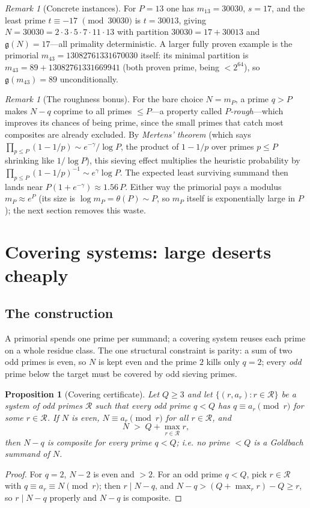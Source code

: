 \documentclass[11pt]{article}
\theoremstyle{plain}
\newtheorem{proposition}[theorem]{Proposition}
\theoremstyle{definition}
\theoremstyle{remark}
\newtheorem{remark}[theorem]{Remark}
\newcommand{\N}{N}
\newcommand{\g}{\mathfrak{g}}
\begin{document}
\begin{remark}[Concrete instances]\label{rem:concrete}
For $P=13$ one has $m_{13}=30030$, $s=17$, and the least prime $t\equiv-17$
$\pmod{30030}$ is $t=30013$, giving $\N=30030=2\cdot3\cdot5\cdot7\cdot11\cdot13$
with partition $30030=17+30013$ and $\g(\N)=17$---all primality deterministic. A
larger fully proven example is the primorial $m_{43}=13082761331670030$ itself:
its minimal partition is $m_{43}=89+13082761331669941$ (both proven prime, being
$<2^{64}$), so $\g(m_{43})=89$ unconditionally.
\end{remark}

\begin{remark}[The roughness bonus]\label{rem:rough}
For the bare choice $\N=m_P$, a prime $q>P$ makes $\N-q$ coprime to all primes
$\le P$---a property called \emph{$P$-rough}---which improves its chances of being
prime, since the small primes that catch most composites are already excluded. By
\emph{Mertens' theorem} (which says $\prod_{p\le P}(1-1/p)\sim e^{-\gamma}/\log P$,
the product of $1-1/p$ over primes $p\le P$ shrinking like $1/\log P$), this
sieving effect multiplies the heuristic probability by
$\prod_{p\le P}(1-1/p)^{-1}\sim e^\gamma\log P$. The expected least surviving
summand then lands near $P(1+e^{-\gamma})\approx1.56\,P$. Either way the primorial
pays a modulus $m_P\approx e^{P}$ (its size is $\log m_P=\theta(P)\sim P$, so $m_P$
itself is exponentially large in $P$); the next section removes this waste.
\end{remark}

\section{Covering systems: large deserts cheaply}\label{sec:covering}

\subsection{The construction}

A primorial spends one prime per summand; a covering system reuses each prime on
a whole residue class. The one structural constraint is parity: a sum of two odd
primes is even, so $\N$ is kept even and the prime $2$ kills only $q=2$; every
\emph{odd} prime below the target must be covered by odd sieving primes.

\begin{proposition}[Covering certificate]\label{prop:cover}
Let $Q\ge3$ and let $\{(r,a_r):r\in\mathcal R\}$ be a system of odd primes
$\mathcal R$ such that every odd prime $q<Q$ has $q\equiv a_r\pmod r$ for some
$r\in\mathcal R$. If $\N$ is even, $\N\equiv a_r\pmod r$ for all $r\in\mathcal R$,
and
\[
\N\;>\;Q+\max_{r\in\mathcal R}r,
\]
then $\N-q$ is composite for every prime $q<Q$; i.e. no prime $<Q$ is a Goldbach
summand of $\N$.
\end{proposition}
\begin{proof}
For $q=2$, $\N-2$ is even and $>2$. For an odd prime $q<Q$, pick
$r\in\mathcal R$ with $q\equiv a_r\equiv\N\pmod r$; then $r\mid\N-q$, and
$\N-q>(Q+\max_r r)-Q\ge r$, so $r\mid\N-q$ properly and $\N-q$ is composite.
\end{proof}
\end{document}
